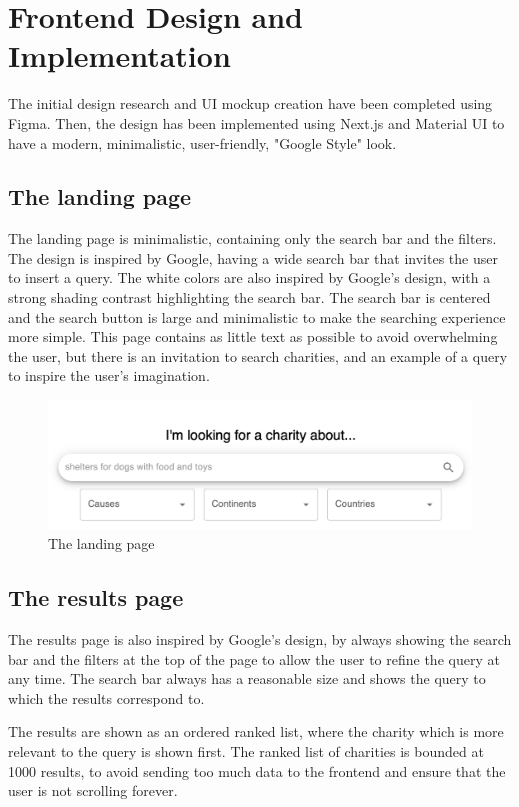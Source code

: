 \documentclass[unicode,9pt,a4paper,oneside,numbers=endperiod,openany]{scrartcl}
\begin{document}
\section{Frontend Design and Implementation}

The initial design research and UI mockup creation have been completed using Figma.
Then, the design has been implemented using Next.js and Material UI to have a modern, minimalistic, user-friendly,  "Google Style" look.

\subsection{The landing page}

The landing page is minimalistic, containing only the search bar and the filters. The design is inspired by Google, having a wide search bar that invites the user to insert a query.
The white colors are also inspired by Google's design, with a strong shading contrast highlighting the search bar.
The search bar is centered and the search button is large and minimalistic to make the searching experience more simple.
This page contains as little text as possible to avoid overwhelming the user, but there is an invitation to search charities, and an example of a query to inspire the user's imagination.

\begin{figure}[h]
    \centering
    \includegraphics[width=0.6\linewidth]{fig/main-page.png}
    \caption{The landing page}
\end{figure}


\subsection{The results page}

The results page is also inspired by Google's design, by always showing the search bar and the filters at the top of the page to
allow the user to refine the query at any time. The search bar always has a reasonable size and shows the query to which the results correspond to.

The results are shown as an ordered ranked list, where the charity which is more relevant to the query is shown first.
The ranked list of charities is bounded at 1000 results, to avoid
sending too much data to the frontend and ensure that the user is not scrolling forever.
\end{document}
